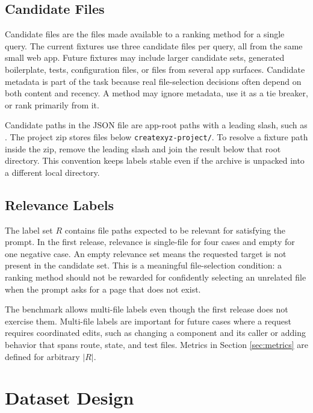 \documentclass[11pt,a4paper]{article}
\begin{document}
\subsection{Candidate Files}

Candidate files are the files made available to a ranking method for a single
query. The current fixtures use three candidate files per query, all from the
same small web app. Future fixtures may include larger candidate sets, generated
boilerplate, tests, configuration files, or files from several app surfaces.
Candidate metadata is part of the task because real file-selection decisions
often depend on both content and recency. A method may ignore metadata, use it
as a tie breaker, or rank primarily from it.

Candidate paths in the JSON file are app-root paths with a leading slash, such
as . The project zip stores files below
\texttt{createxyz-project/}. To resolve a fixture path inside the zip, remove
the leading slash and join the result below that root directory. This convention
keeps labels stable even if the archive is unpacked into a different local
directory.

\subsection{Relevance Labels}

The label set $R$ contains file paths expected to be relevant for satisfying the
prompt. In the first release, relevance is single-file for four cases and empty
for one negative case. An empty relevance set means the requested target is not
present in the candidate set. This is a meaningful file-selection condition: a
ranking method should not be rewarded for confidently selecting an unrelated
file when the prompt asks for a page that does not exist.

The benchmark allows multi-file labels even though the first release does not
exercise them. Multi-file labels are important for future cases where a request
requires coordinated edits, such as changing a component and its caller or
adding behavior that spans route, state, and test files. Metrics in Section
\ref{sec:metrics} are defined for arbitrary $|R|$.

\section{Dataset Design}
\label{sec:dataset-design}
\end{document}

